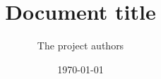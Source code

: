 \usepackage{iftex}
\ifPDFTeX
  \usepackage[T1]{fontenc}
  \usepackage{lmodern}
\fi
\usepackage[english]{babel}
\usepackage{csquotes}
\usepackage{amsmath}
\usepackage{amssymb}
\usepackage{amsthm}
\usepackage{graphicx}
\usepackage{booktabs}
\usepackage[backend=biber,style=authoryear]{biblatex}
\usepackage{hyperref}
\hypersetup{hidelinks}
\title{Document title}
\author{The project authors}
\date{\today}
